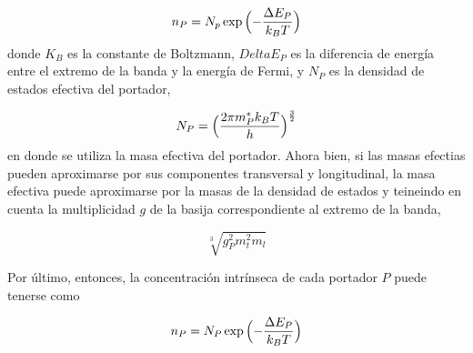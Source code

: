 \begin{equation}\label{EqPortadoresT}
  n_P = N_p \exp {\Bigl( -\frac{\Delta E_P}{k_B T} \Bigr)}
\end{equation}
donde $K_B$ es la constante de Boltzmann, $Delta E_P$ es la diferencia de energía 
entre el extremo de la banda y la energía de Fermi, y  $N_P$ es la densidad de
estados efectiva del portador, 

\begin{equation}\label{EqCarrEffDens}
  N_P = \Bigl( \frac{2 \pi m_{P}^{*} k_B T }{h} \Bigr)^{\frac{3}{2}}
\end{equation}
en donde se utiliza la masa efectiva del portador. Ahora bien, si las masas efectias pueden 
aproximarse por sus componentes transversal y longitudinal, la masa efectiva 
puede aproximarse por la masas de la densidad de estados y teineindo en cuenta la 
multiplicidad $g$ de la basija correspondiente al extremo de la banda, 

\begin{equation}\label{EqDOSEffMass}
  \sqrt[3]{g_P^2 m_t ^2 m_l}
\end{equation}

Por último, entonces, la concentración intrínseca de cada portador $P$ puede tenerse como

\begin{equation}\label{EqFullCarrierConcentration}
  n_P = N_P \exp{ \Bigl( -\frac{\Delta E_P}{k_B T} \Bigr) } 
\end{equation}

